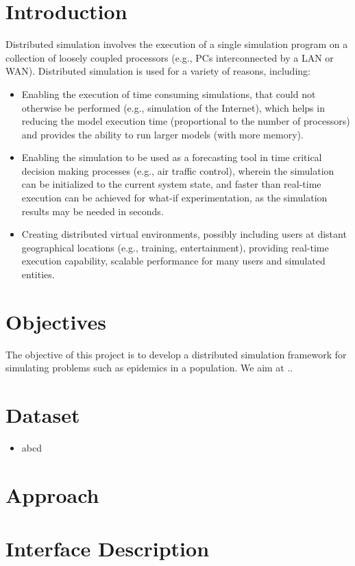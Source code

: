 \documentclass[12pt,a4paper]{article}
\begin{document}
\section{Introduction}
	Distributed simulation involves the execution of a single simulation program on a collection of loosely coupled processors (e.g., PCs interconnected by a LAN or WAN). Distributed simulation is used for a variety of reasons, including:
	\begin{itemize}
		\item Enabling the execution of time consuming simulations, that could not otherwise be performed (e.g., simulation of the Internet), which helps in reducing the model execution time (proportional to the number of processors) and provides the ability to run larger models (with more memory).
		\item Enabling the simulation to be used as a forecasting tool in time critical decision making processes (e.g., air traffic control), wherein the simulation can be initialized to the current system state, and faster than real-time execution can be achieved for what-if experimentation, as the simulation results may be needed in seconds.
		\item Creating distributed virtual environments, possibly including users at distant geographical locations (e.g., training, entertainment), providing real-time execution capability, scalable performance for many users and simulated entities.
	\end{itemize}


\section{Objectives}
	The objective of this project is to develop a distributed simulation framework for simulating problems such as epidemics in a population. We aim at ..

\section{Dataset}
	\begin{itemize}[nolistsep]
		\item abcd
	\end{itemize}

\section{Approach}

\section{Interface Description}
	 
\end{document}
